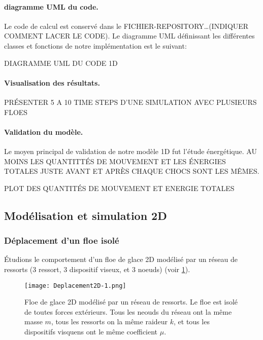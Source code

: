 \paragraph{diagramme UML du code.} Le code de calcul est conservé dans le FICHIER-REPOSITORY\dots (INDIQUER COMMENT LACER LE CODE). Le diagramme UML définissant les différentes classes et fonctions de notre implémentation est le suivant:

DIAGRAMME UML DU CODE 1D

\paragraph{Visualisation des résultats.} 
PRÉSENTER 5 A 10 TIME STEPS D'UNE SIMULATION AVEC PLUSIEURS FLOES


\paragraph{Validation du modèle.} Le moyen principal de validation de notre modèle 1D fut l'étude énergétique. AU MOINS LES QUANTITTÉS DE MOUVEMENT ET LES ÉNERGIES TOTALES JUSTE AVANT ET APRÈS CHAQUE CHOCS SONT LES MÊMES.

PLOT DES QUANTITÉS DE MOUVEMENT ET ENERGIE TOTALES 




\subsection{Modélisation et simulation 2D}









\subsubsection{Déplacement d'un floe isolé}

Étudions le comportement d'un floe de glace 2D modélisé par un réseau de ressorts (3 ressort, 3 dispositif viseux, et 3 noeuds) (voir \cref{fig:deplacement2d}).
\begin{figure}[!h]
    \centering
    \texttt{[image: Deplacement2D-1.png]}
    \caption{Floe de glace 2D modélisé par un réseau de ressorts. Le floe est isolé de toutes forces extérieurs. Tous les neouds du réseau ont la même masse $m$, tous les ressorts on la même raideur $k$, et tous les dispositifs visquens ont le même coefficient $\mu$.}
    \label{fig:deplacement2d}
\end{figure}



